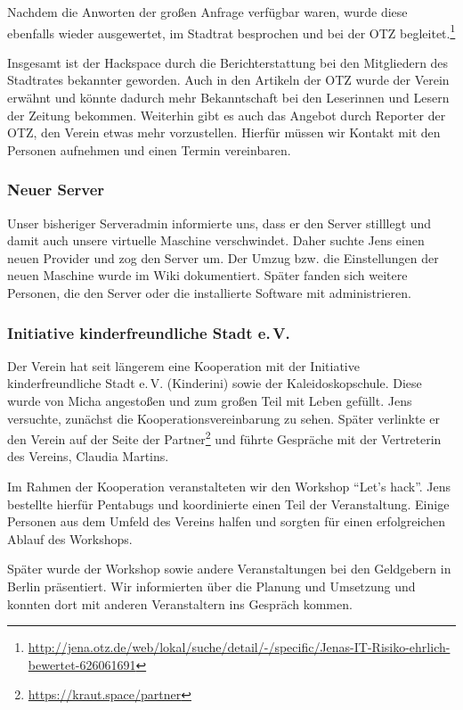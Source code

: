 \documentclass[ngerman]{scrartcl}
\begin{document}
Nachdem die Anworten der großen Anfrage verfügbar waren, wurde diese ebenfalls
wieder ausgewertet, im Stadtrat besprochen und bei der OTZ
begleitet.\footnote{\url{http://jena.otz.de/web/lokal/suche/detail/-/specific/Jenas-IT-Risiko-ehrlich-bewertet-626061691}}

Insgesamt ist der Hackspace durch die Berichterstattung bei den Mitgliedern des
Stadtrates bekannter geworden. Auch in den Artikeln der OTZ wurde der Verein
erwähnt und könnte dadurch mehr Bekanntschaft bei den Leserinnen und Lesern der
Zeitung bekommen. Weiterhin gibt es auch das Angebot durch Reporter der OTZ, den
Verein etwas mehr vorzustellen. Hierfür müssen wir Kontakt mit den Personen
aufnehmen und einen Termin vereinbaren.

\subsubsection{Neuer Server}

Unser bisheriger Serveradmin informierte uns, dass er den Server stilllegt und
damit auch unsere virtuelle Maschine verschwindet. Daher suchte Jens einen neuen
Provider und zog den Server um. Der Umzug bzw. die Einstellungen der neuen
Maschine wurde im Wiki dokumentiert. Später fanden sich weitere Personen, die
den Server oder die installierte Software mit administrieren.

\subsubsection{Initiative kinderfreundliche Stadt e.\,V.}

Der Verein hat seit längerem eine Kooperation mit der Initiative
kinderfreundliche Stadt e.\,V. (Kinderini) sowie der Kaleidoskopschule. Diese
wurde von Micha angestoßen und zum großen Teil mit Leben gefüllt. Jens
versuchte, zunächst die Kooperationsvereinbarung zu sehen. Später verlinkte er
den Verein auf der Seite der Partner\footnote{\url{https://kraut.space/partner}}
und führte Gespräche mit der Vertreterin des Vereins, Claudia Martins.

Im Rahmen der Kooperation veranstalteten wir den Workshop \enquote{Let's
  hack}. Jens bestellte hierfür Pentabugs und koordinierte einen Teil der
Veranstaltung. Einige Personen aus dem Umfeld des Vereins halfen und sorgten für
einen erfolgreichen Ablauf des Workshops.

Später wurde der Workshop sowie andere Veranstaltungen bei den Geldgebern in
Berlin präsentiert. Wir informierten über die Planung und Umsetzung und konnten
dort mit anderen Veranstaltern ins Gespräch kommen.
\end{document}
